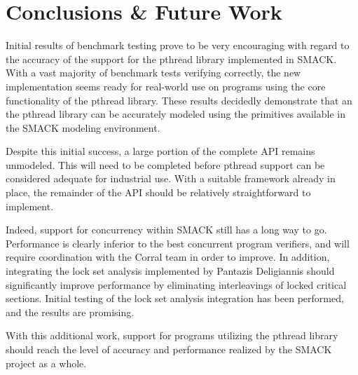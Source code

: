 \chapter{Conclusions \& Future Work}\label{ch:conclusion}
Initial results of benchmark testing prove to be very encouraging with
regard to the accuracy of the support for the pthread library
implemented in SMACK.  With a vast majority of benchmark tests
verifying correctly, the new implementation seems ready for real-world
use on programs using the core functionality of the pthread library.
These results decidedly demonstrate that an the pthread library can be
accurately modeled using the primitives available in the SMACK
modeling environment.

Despite this initial success, a large portion of the complete API
remains unmodeled.  This will need to be completed before pthread
support can be considered adequate for industrial use.  With a
suitable framework already in place, the remainder of the  API should
be relatively straightforward to implement.

Indeed, support for concurrency within SMACK still has a long way to
go.  Performance is clearly inferior to the best concurrent program
verifiers, and will require coordination with the Corral team in order
to improve. In addition, integrating the lock set analysis implemented
by Pantazis Deligiannis should significantly improve performance by
eliminating interleavings of locked critical sections.  Initial
testing of the lock set analysis integration has been performed, and
the results are promising.

With this additional work, support for programs utilizing the pthread
library should reach the level of accuracy and performance realized by
the SMACK project as a whole.

